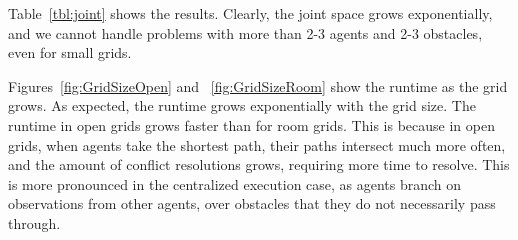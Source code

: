 \documentclass[letterpaper]{article} %
\begin{document}
Table~\ref{tbl:joint} shows the results. Clearly, the joint space grows exponentially, and we cannot handle problems with more than 2-3 agents and 2-3 obstacles, even for small grids. 



Figures~\ref{fig:GridSizeOpen} and ~\ref{fig:GridSizeRoom} show the runtime as the grid grows. As expected, the runtime grows exponentially with the grid size. The runtime in open grids grows faster than for room grids. This is because in open grids, when agents take the shortest path, their paths intersect much more often, and the amount of conflict resolutions grows, requiring more time to resolve. This is more pronounced in the centralized execution case, as agents branch on observations from other agents, over obstacles that they do not necessarily pass through. 
\end{document}
